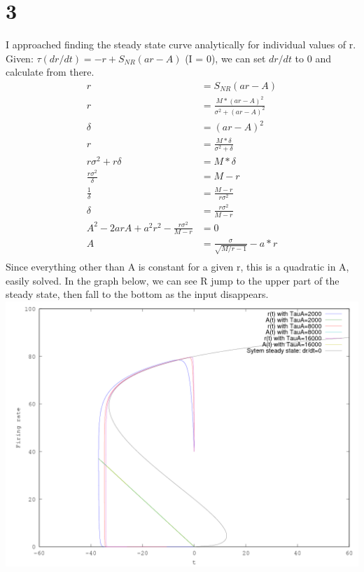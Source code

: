 \documentclass[11pt]{article}
\begin{document}
\newpage
\section*{3}
I approached finding the steady state curve analytically for individual values of r.  Given:
$\tau(dr/dt) = -r + S_{NR}(ar - A)$ (I = 0), we can set $dr/dt$ to 0 and calculate from there.
\begin{align*}
  r &= S_{NR}(ar-A)\\
  r &= \frac{M*(ar-A)^2}{\sigma^2 + (ar-A)^2}\\
  \delta &= (ar - A)^2\\
  r &= \frac{M*\delta}{\sigma^2 + \delta}\\
  r\sigma^2 + r\delta &= M*\delta\\
  \frac{r\sigma^2}{\delta} &= M-r\\
  \frac{1}{\delta} &= \frac{M-r}{r\sigma^2}\\
  \delta &= \frac{r\sigma^2}{M-r}\\
  A^2 - 2arA + a^2r^2 - \frac{r\sigma^2}{M-r} &= 0\\
  A &= \frac{\sigma}{\sqrt{M/r-1}} - a*r \\
\end{align*}
Since everything other than A is constant for a given r, this is a quadratic in A, easily solved.  In the graph below, we can see R jump to the upper part of the steady state, then fall to the bottom as the input disappears.\\
\includegraphics[width=6in]{3.png}\\

\newpage
\end{document}
